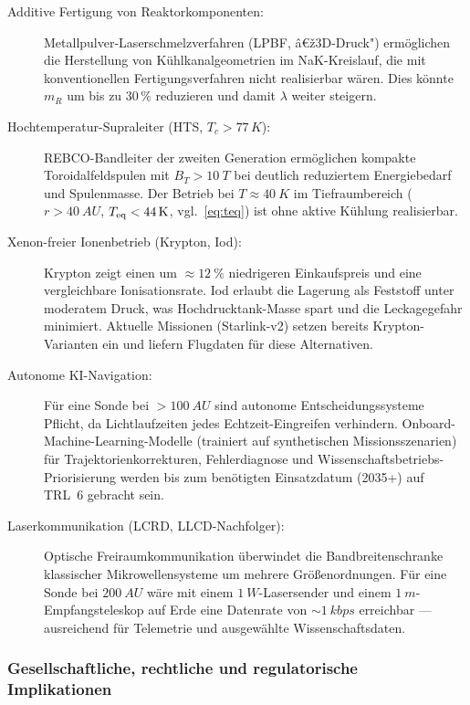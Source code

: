 ﻿\documentclass[a4paper,12pt,twoside]{article}
\theoremstyle{plain}
\theoremstyle{definition}
\theoremstyle{remark}
\begin{document}
	\begin{description}
		\item[Additive Fertigung von Reaktorkomponenten:]
		Metallpulver-Laserschmelzverfahren (LPBF, â€ž3D-Druck") ermöglichen
		die Herstellung von Kühlkanalgeometrien im NaK-Kreislauf, die mit
		konventionellen Fertigungsverfahren nicht realisierbar wären.
		Dies könnte $m_R$ um bis zu $30\,\%$ reduzieren und damit $\lambda$
		weiter steigern.

		\item[Hochtemperatur-Supraleiter (HTS, $T_c > 77\,\si{K}$):]
		REBCO-Bandleiter der zweiten Generation ermöglichen kompakte
		Toroidalfeldspulen mit $B_T > \SI{10}{T}$ bei deutlich reduziertem
		Energiebedarf und Spulenmasse. Der Betrieb bei $T \approx \SI{40}{K}$
		im Tiefraumbereich ($r > \SI{40}{AU}$, $T_{\rm eq} < \SI{44}{K}$,
		vgl.\ \cref{eq:teq}) ist ohne aktive Kühlung realisierbar.

		\item[Xenon-freier Ionenbetrieb (Krypton, Iod):]
		Krypton zeigt einen um $\approx\SI{12}{\%}$ niedrigeren Einkaufspreis
		und eine vergleichbare Ionisationsrate. Iod erlaubt die Lagerung als
		Feststoff unter moderatem Druck, was Hochdrucktank-Masse spart und die
		Leckagegefahr minimiert. Aktuelle Missionen (Starlink-v2) setzen bereits
		Krypton-Varianten ein und liefern Flugdaten für diese Alternativen.

		\item[Autonome KI-Navigation:]
		Für eine Sonde bei $>\SI{100}{AU}$ sind autonome Entscheidungssysteme
		Pflicht, da Lichtlaufzeiten jedes Echtzeit-Eingreifen verhindern.
		Onboard-Machine-Learning-Modelle (trainiert auf synthetischen
		Missionsszenarien) für Trajektorienkorrekturen, Fehlerdiagnose und
		Wissenschaftsbetriebs-Priorisierung werden bis zum benötigten
		Einsatzdatum (2035+) auf TRL~6 gebracht sein.

		\item[Laserkommuni\-kation (LCRD, LLCD-Nachfolger):]
		Optische Freiraumkommunikation überwindet die Bandbreitenschranke
		klassischer Mikrowellensysteme um mehrere Größenordnungen. Für
		eine Sonde bei $\SI{200}{AU}$ wäre mit einem $\SI{1}{W}$-Lasersender
		und einem $\SI{1}{m}$-Empfangsteleskop auf Erde eine Datenrate von
		$\sim\SI{1}{kbps}$ erreichbar --- ausreichend für Telemetrie und
		ausgewählte Wissenschaftsdaten.
	\end{description}

	\subsubsection{Gesellschaftliche, rechtliche und regulatorische Implikationen}
\end{document}
